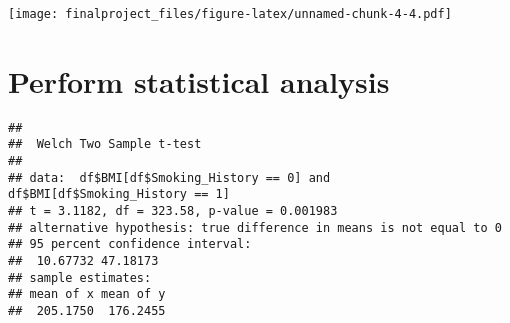 \documentclass[
]{article}
\newenvironment{Shaded}{\begin{snugshade}}{\end{snugshade}}
\newcommand{\AttributeTok}[1]{\textcolor[rgb]{0.77,0.63,0.00}{#1}}
\newcommand{\CommentTok}[1]{\textcolor[rgb]{0.56,0.35,0.01}{\textit{#1}}}
\newcommand{\DecValTok}[1]{\textcolor[rgb]{0.00,0.00,0.81}{#1}}
\newcommand{\FunctionTok}[1]{\textcolor[rgb]{0.00,0.00,0.00}{#1}}
\newcommand{\NormalTok}[1]{#1}
\newcommand{\OtherTok}[1]{\textcolor[rgb]{0.56,0.35,0.01}{#1}}
\newcommand{\SpecialCharTok}[1]{\textcolor[rgb]{0.00,0.00,0.00}{#1}}
\newcommand{\StringTok}[1]{\textcolor[rgb]{0.31,0.60,0.02}{#1}}
\begin{document}
\begin{Shaded}
\end{Shaded}

\texttt{[image: finalproject\_files/figure-latex/unnamed-chunk-4-4.pdf]}

\hypertarget{perform-statistical-analysis}{%
\section{Perform statistical
analysis}\label{perform-statistical-analysis}}

\begin{Shaded}
\end{Shaded}

\begin{verbatim}
## 
##  Welch Two Sample t-test
## 
## data:  df$BMI[df$Smoking_History == 0] and df$BMI[df$Smoking_History == 1]
## t = 3.1182, df = 323.58, p-value = 0.001983
## alternative hypothesis: true difference in means is not equal to 0
## 95 percent confidence interval:
##  10.67732 47.18173
## sample estimates:
## mean of x mean of y 
##  205.1750  176.2455
\end{verbatim}
\end{document}
